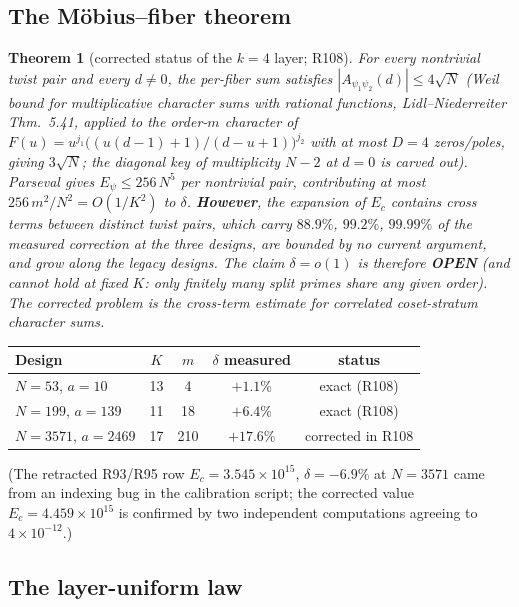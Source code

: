 \documentclass[11pt]{article}
\newtheorem{theorem}{Theorem}[section]
\begin{document}
\subsection{The M\"obius--fiber theorem}

\begin{theorem}[corrected status of the $k{=}4$ layer; R108]\label{thm:mobius}
For every nontrivial twist pair and every $d \ne 0$, the per-fiber sum
satisfies $|A_{\psi_1\psi_2}(d)| \le 4\sqrt{N}$ (Weil bound for
multiplicative character sums with rational functions,
Lidl--Niederreiter Thm.~5.41, applied to the order-$m$ character of
$F(u) = u^{j_1}\bigl((u(d{-}1)+1)/(d{-}u{+}1)\bigr)^{j_2}$ with at most
$D=4$ zeros/poles, giving $3\sqrt{N}$; the diagonal key of
multiplicity $N{-}2$ at $d=0$ is carved out).  Parseval gives
$E_\psi \le 256\,N^5$ per nontrivial pair, contributing at most
$256\,m^2/N^2 = O(1/K^2)$ to $\delta$.  \textbf{However}, the
expansion of $E_c$ contains cross terms between distinct twist pairs,
which carry $88.9\%$, $99.2\%$, $99.99\%$ of the measured correction
at the three designs, are bounded by no current argument, and grow
along the legacy designs.  The claim $\delta = o(1)$ is therefore
\textbf{OPEN} (and cannot hold at fixed $K$: only finitely many split
primes share any given order).  The corrected problem is the
cross-term estimate for correlated coset-stratum character sums.
\end{theorem}

\begin{center}
\begin{tabular}{lcccc}
\toprule
Design & $K$ & $m$ & $\delta$ measured & status \\
\midrule
$N = 53$, $a = 10$ & 13 & 4 & $+1.1\%$ & exact (R108) \\
$N = 199$, $a = 139$ & 11 & 18 & $+6.4\%$ & exact (R108) \\
$N = 3571$, $a = 2469$ & 17 & 210 & $+17.6\%$ & corrected in R108 \\
\bottomrule
\end{tabular}
\end{center}

\noindent (The retracted R93/R95 row $E_c = 3.545\times10^{15}$,
$\delta = -6.9\%$ at $N=3571$ came from an indexing bug in the
calibration script; the corrected value $E_c = 4.459\times10^{15}$ is
confirmed by two independent computations agreeing to $4\times10^{-12}$.)

\subsection{The layer-uniform law}\label{sec:layers}
\end{document}
